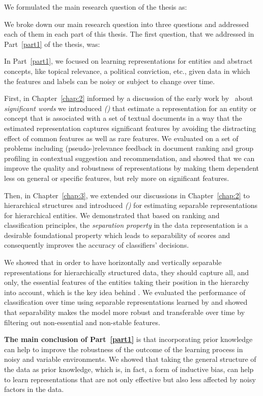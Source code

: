 We formulated the main research question of the thesis as:
%
%

We broke down our main research question into three questions and addressed each of them in each part of this thesis.
The first question, that we addressed in Part~\ref{part1} of the thesis, was:
%

In Part~\ref{part1}, we focused on learning representations for entities and abstract concepts, like topical relevance, a political conviction, etc., given data in which the features and labels can be noisy or subject to change over time.

First, in Chapter~\ref{chap:2} informed by a discussion of the early work by~\citet{Luhn:1958} about \emph{significant words} we introduced \emph{\SWLMs (\acswlms)} that estimate a representation for an entity or concept that is associated with a set of textual documents in a way that the estimated representation captures significant features by avoiding the distracting effect of common features as well as rare features. We evaluated \acswlms on a set of problems including (pseudo-)relevance feedback in document ranking and group profiling in contextual suggestion and recommendation, and showed that we can improve the quality and robustness of representations by making them dependent less on general or specific features, but rely more on significant features.

Then, in Chapter~\ref{chap:3}, we extended our discussions in Chapter~\ref{chap:2} to hierarchical structures and introduced \emph{\HSWLMs (\achswlms)} for estimating separable representations for hierarchical entities. We demonstrated that based on ranking and classification principles, the \emph{separation property} in the data representation is a desirable foundational property which leads to separability of scores and consequently improves the accuracy of classifiers' decisions. 

We showed that in order to have horizontally and vertically separable representations for hierarchically structured data, they should capture all, and only, the essential features of the entities taking their position in the hierarchy into account, which is the key idea behind \achswlms. We evaluated the performance of classification over time using separable representations learned by \achswlms and showed that separability makes the model more robust and transferable over time by filtering out non-essential and non-stable features.

\textbf{The main conclusion of Part~\ref{part1}} is that incorporating prior knowledge can help to improve the robustness of the outcome of the learning process in noisy and variable environments. We showed that taking the general structure of the data as prior knowledge, which is, in fact, a form of inductive bias, can help to learn representations that are not only effective but also less affected by noisy factors in the data.

